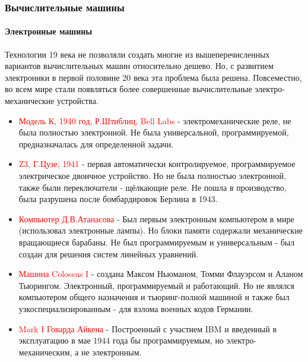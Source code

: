 \documentclass[aspectratio=169]{beamer}
\begin{document}
\begin{frame}
\frametitle{Вычислительные машины}
\framesubtitle{Электронные машины}
\justifying
\scriptsize
Технологии 19 века не позволяли создать многие из вышеперечисленных вариантов вычислительных машин относительно дешево. Но, с развитием электроники в первой половине 20 века эта проблема была решена.
Повсеместно, во всем мире стали появляться более совершенные вычислительные электро-механические устройства.
\begin{itemize}
\item{\textcolor{red}{Модель К, 1940 год, Р.Штиблиц, Bell Labs} - электромеханические реле, не была полностью электронной. Не была универсальной, программируемой, предназначалась для определенной задачи.}

\item{\textcolor{red}{Z3, Г.Цузе, 1941} - первая автоматически контролируемое, программируемое электрическое двоичное устройство. Но не была полностью электронной, также были переключатели - щёлкающие реле. Не пошла в производство, была разрушена после бомбардировок Берлина в 1943.}

\item{\textcolor{red}{Компьютер Д.В.Атанасова} - Был первым электронным компьютером в мире (использовал электронные лампы). Но блоки памяти содержали механические вращающиеся барабаны. Не был программируемым и универсальным - был создан для решения систем линейных уравнений.
}

\item{\textcolor{red}{Машина Colossus I} - создана Максом Ньюманом, Томми Флауэрсом и Аланом Тьюрингом. Электронный, программируемый и работающий. Но не являлся компьютером общего назначения и тьюринг-полной машиной и также был узкоспециализированным - для взлома военных кодов Германии.}

\item{\textcolor{red}{Mark I Говарда Айкена} - Построенный с участием IBM и введенный в эксплуатацию в мае 1944 года бы программируемым, но электро-механическим, а не электронным.}

\end{itemize}
\end{frame}
\end{document}
